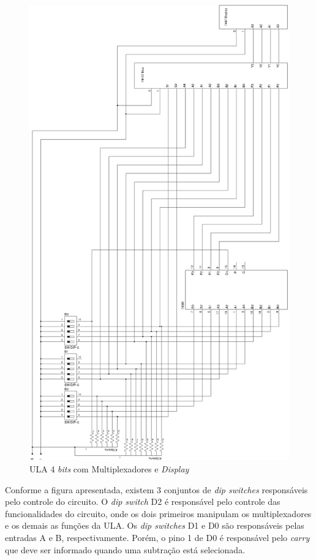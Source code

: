 \documentclass{article}
\begin{document}
\begin{figure}
    \centering{}
    \includegraphics[width=\textwidth]{ci74381.ps}
    \caption{ULA 4 \emph{bits} com Multiplexadores e \emph{Display}}
    \label{fig:ci74381}
\end{figure}

Conforme a figura apresentada, existem 3 conjuntos de \emph{dip switches}
responsáveis pelo controle do circuito. O \emph{dip switch} D2 é responsável
pelo controle das funcionalidades do circuito, onde os dois primeiros manipulam
os multiplexadores e os demais as funções da ULA. Os \emph{dip switches} D1 e D0
são responsáveis pelas entradas A e B, respectivamente. Porém, o pino 1 de D0 é
responsável pelo \emph{carry} que deve ser informado quando uma subtração está
selecionada.
\end{document}
